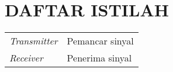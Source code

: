 \chapter*{DAFTAR ISTILAH}

\begin{center}
	\centering
	\begin{tabular}{ll}
		\textit{Transmitter} & Pemancar sinyal\\
		\textit{Receiver} & Penerima sinyal\\
		
		
		
	\end{tabular}
\end{center}